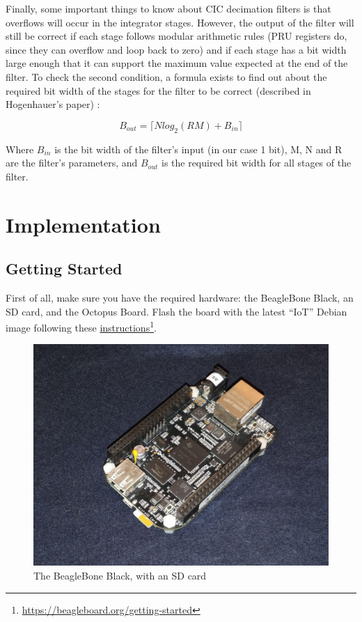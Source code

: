 \documentclass[]{report}
\begin{document}
Finally, some important things to know about CIC decimation filters is
that overflows will occur in the integrator stages. However, the output
of the filter will still be correct if each stage follows modular
arithmetic rules (PRU registers do, since they can overflow and loop
back to zero) and if each stage has a bit width large enough that it can
support the maximum value expected at the end of the filter. To check
the second condition, a formula exists to find out about the required
bit width of the stages for the filter to be correct (described in
Hogenhauer's paper) :

\[B_{out} = \lceil Nlog_2(RM) + B_{in} \rceil\]

Where \(B_{in}\) is the bit width of the filter's input (in our case 1
bit), M, N and R are the filter's parameters, and \(B_{out}\) is the
required bit width for all stages of the filter.

\hypertarget{implementation}{%
\chapter{Implementation}\label{implementation}}

\hypertarget{getting-started}{%
\section{Getting Started}\label{getting-started}}

First of all, make sure you have the required hardware: the BeagleBone
Black, an SD card, and the Octopus Board. Flash the board with the
latest ``IoT'' Debian image following these
\href{https://beagleboard.org/getting-started}{instructions}\footnote{\url{https://beagleboard.org/getting-started}}.

\begin{figure}[h]
\centering
\includegraphics[width=0.9\linewidth]{Pictures/BBB.jpg}
\caption{The BeagleBone Black, with an SD card}
\end{figure}
\end{document}
